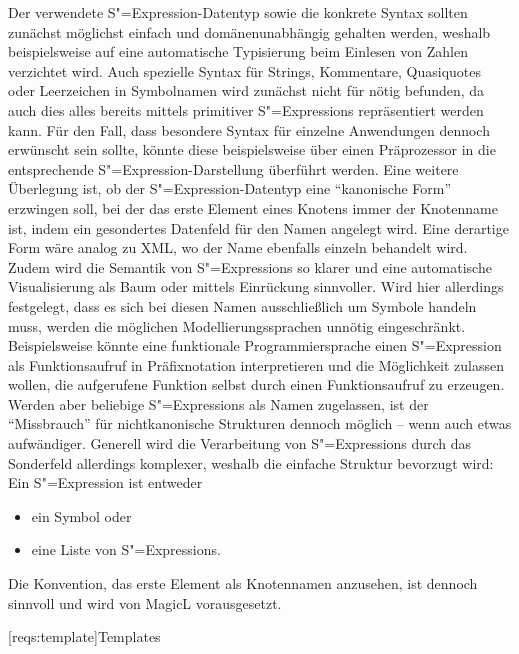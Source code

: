 \documentclass[12pt, a4paper, bibgerm]{scrbook}
\newcommand\lsection{}
\newcommand{\sexp}{S"=Expression}
\newcommand{\sexps}{S"=Expressions}
\begin{document}
Der verwendete \sexp{}-Datentyp sowie die konkrete Syntax sollten
zunächst möglichst einfach und domänenunabhängig gehalten werden,
weshalb beispielsweise auf eine automatische Typisierung beim Einlesen
von Zahlen verzichtet wird. Auch spezielle Syntax für Strings,
Kommentare, Quasiquotes oder Leerzeichen in Symbolnamen wird zunächst
nicht für nötig befunden, da auch dies alles bereits mittels primitiver
\sexps{} repräsentiert werden kann. Für den Fall, dass besondere Syntax
für einzelne Anwendungen dennoch erwünscht sein sollte, könnte diese
beispielsweise über einen Präprozessor in die entsprechende
\sexp{}-Darstellung überführt werden. Eine weitere Überlegung ist, ob der
\sexp{}-Datentyp eine "`kanonische Form"' erzwingen soll, bei der das
erste Element eines Knotens immer der Knotenname ist, indem ein
gesondertes Datenfeld für den Namen angelegt wird. Eine derartige Form
wäre analog zu XML, wo der Name ebenfalls einzeln behandelt wird. Zudem
wird die Semantik von \sexps{} so klarer und eine automatische
Visualisierung als Baum oder mittels Einrückung sinnvoller.  Wird hier
allerdings festgelegt, dass es sich bei diesen Namen ausschließlich um
Symbole handeln muss, werden die möglichen Modellierungssprachen unnötig
eingeschränkt. Beispielsweise könnte eine funktionale Programmiersprache
einen \sexp{} als Funktionsaufruf in Präfixnotation interpretieren und
die Möglichkeit zulassen wollen, die aufgerufene Funktion selbst durch
einen Funktionsaufruf zu erzeugen. Werden aber beliebige \sexps{} als
Namen zugelassen, ist der "`Missbrauch"' für nichtkanonische Strukturen
dennoch möglich -- wenn auch etwas aufwändiger. Generell wird die
Verarbeitung von \sexps{} durch das Sonderfeld allerdings komplexer,
weshalb die einfache Struktur bevorzugt wird: Ein \sexp{} ist entweder 
\begin{itemize}
\item ein Symbol oder 
\item eine Liste von \sexps{}.
\end{itemize}
Die Konvention, das erste Element als Knotennamen anzusehen, ist dennoch
sinnvoll und wird von MagicL vorausgesetzt.

\lsection[reqs:template]{Templates}
\end{document}
